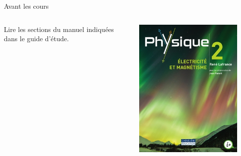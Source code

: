 \documentclass[12pt]{beamer}
\begin{document}
\begin{frame}{Avant les cours}
\begin{columns}
Lire les sections du manuel indiquées dans le guide d'étude.

\vspace{\baselineskip}


\includegraphics[width=0.9\textwidth]{images/lafrance-em.jpg}

\end{columns}

\end{frame}
\end{document}
